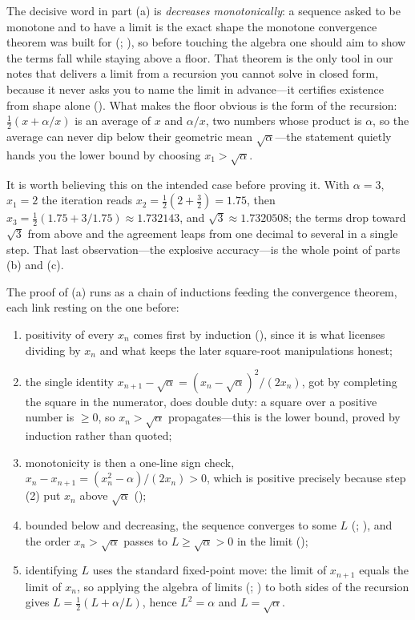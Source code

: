 \documentclass[main.tex]{subfiles}
\begin{document}
\begin{Reflection}
The decisive word in part (a) is \emph{decreases monotonically}: a sequence asked to be monotone and
to have a limit is the exact shape the monotone convergence theorem was built for
(; ), so before touching the
algebra one should aim to show the terms fall while staying above a floor. That theorem is the only tool
in our notes that delivers a limit from a recursion you cannot solve in closed form, because it never
asks you to name the limit in advance---it certifies existence from shape alone (). What
makes the floor obvious is the form of the recursion: $\tfrac12(x+\alpha/x)$ is an average of $x$ and
$\alpha/x$, two numbers whose product is $\alpha$, so the average can never dip below their geometric
mean $\sqrt\alpha$---the statement quietly hands you the lower bound by choosing $x_1>\sqrt\alpha$.

It is worth believing this on the intended case before proving it. With $\alpha=3$, $x_1=2$ the
iteration reads $x_2=\tfrac12(2+\tfrac32)=1.75$, then $x_3=\tfrac12(1.75+3/1.75)\approx1.732143$, and
$\sqrt3\approx1.7320508$; the terms drop toward $\sqrt3$ from above and the agreement leaps from one
decimal to several in a single step. That last observation---the explosive accuracy---is the whole
point of parts (b) and (c).

The proof of (a) runs as a chain of inductions feeding the convergence theorem, each link resting on the
one before:
\begin{enumerate}[leftmargin=1.7em,itemsep=3pt,topsep=2pt,label=\textnormal{(\arabic*)}]
  \item positivity of every $x_n$ comes first by induction (), since it is what licenses
        dividing by $x_n$ and what keeps the later square-root manipulations honest;
  \item the single identity $x_{n+1}-\sqrt\alpha=(x_n-\sqrt\alpha)^2/(2x_n)$, got by completing the
        square in the numerator, does double duty: a square over a positive number is $\ge 0$, so
        $x_n>\sqrt\alpha$ propagates---this is the lower bound, proved by induction rather than quoted;
  \item monotonicity is then a one-line sign check, $x_n-x_{n+1}=(x_n^2-\alpha)/(2x_n)>0$, which is
        positive precisely because step (2) put $x_n$ above $\sqrt\alpha$ ();
  \item bounded below and decreasing, the sequence converges to some $L$
        (; ), and the order
        $x_n>\sqrt\alpha$ passes to $L\ge\sqrt\alpha>0$ in the limit ();
  \item identifying $L$ uses the standard fixed-point move: the limit of $x_{n+1}$ equals the limit of
        $x_n$, so applying the algebra of limits (;
        ) to both sides of the recursion gives $L=\tfrac12(L+\alpha/L)$, hence $L^2=\alpha$
        and $L=\sqrt\alpha$.
\end{enumerate}


\end{Reflection}
\end{document}
